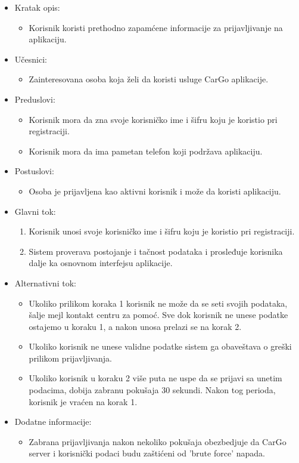 \begin{itemize}
    \item Kratak opis:
        \begin{itemize}
            \item Korisnik koristi prethodno zapamćene informacije za prijavljivanje na aplikaciju.
        \end{itemize}
    \item Učesnici:
        \begin{itemize}
            \item Zainteresovana osoba koja želi da koristi usluge CarGo aplikacije.
        \end{itemize}
    \item Preduslovi:
        \begin{itemize}
            \item Korisnik mora da zna svoje korisničko ime i šifru koju je koristio pri registraciji.
            \item Korisnik mora da ima pametan telefon koji podržava aplikaciju.
        \end{itemize}
    \item Postuslovi:
        \begin{itemize}
            \item Osoba je prijavljena kao aktivni korisnik i može da koristi aplikaciju.
        \end{itemize}
    \item Glavni tok:
        \begin{enumerate}
            \item Korisnik unosi svoje korisničko ime i šifru koju je koristio pri registraciji.
            \item Sistem proverava postojanje i tačnost podataka i prosleđuje korisnika dalje ka osnovnom interfejsu aplikacije.
        \end{enumerate}
    \item Alternativni tok:
        \begin{itemize}
            \item Ukoliko prilikom koraka 1 korisnik ne može da se seti svojih podataka, šalje mejl kontakt centru za pomoć. Sve dok korisnik ne unese podatke ostajemo u koraku 1, a nakon unosa prelazi se na korak 2.
			\item Ukoliko korisnik ne unese validne podatke sistem ga obaveštava o greški prilikom prijavljivanja.
            \item Ukoliko korisnik u koraku 2 više puta ne uspe da se prijavi sa unetim podacima, dobija zabranu pokušaja 30 sekundi. Nakon tog perioda, korisnik je vraćen na korak 1.
        \end{itemize}
    \item Dodatne informacije:
        \begin{itemize}
            \item Zabrana prijavljivanja nakon nekoliko pokušaja obezbedjuje da CarGo server i korisnički podaci budu zaštićeni od 'brute force' napada.
        \end{itemize}
\end{itemize}


